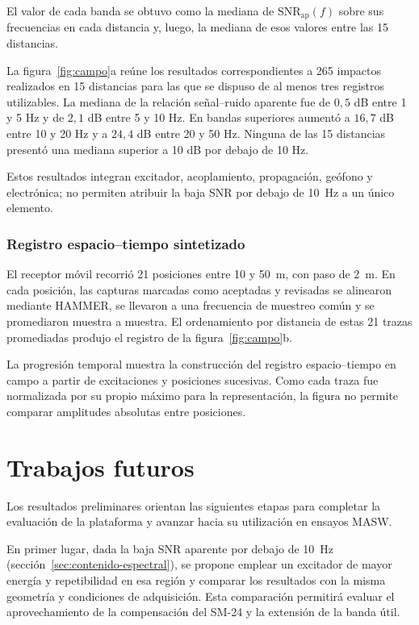 El valor de cada banda se obtuvo como la mediana de \(\mathrm{SNR}_{\mathrm{ap}}(f)\) sobre sus frecuencias en cada distancia y, luego, la mediana de esos valores entre las 15 distancias.

La figura~\ref{fig:campo}a reúne los resultados correspondientes a 265 impactos realizados en 15 distancias para las que se dispuso de al menos tres registros utilizables. La mediana de la relación señal--ruido aparente fue de \(0{,}5\) dB entre 1 y 5 Hz y de \(2{,}1\) dB entre 5 y 10 Hz. En bandas superiores aumentó a \(16{,}7\) dB entre 10 y 20 Hz y a \(24{,}4\) dB entre 20 y 50 Hz. Ninguna de las 15 distancias presentó una mediana superior a 10 dB por debajo de 10 Hz.

Estos resultados integran excitador, acoplamiento, propagación, geófono y electrónica; no permiten atribuir la baja SNR por debajo de 10~Hz a un único elemento.

\subsubsection{Registro espacio--tiempo sintetizado}
\label{sec:registro-espacio-tiempo}

El receptor móvil recorrió 21 posiciones entre 10 y 50~m, con paso de 2~m. En cada posición, las capturas marcadas como aceptadas y revisadas se alinearon mediante HAMMER, se llevaron a una frecuencia de muestreo común y se promediaron muestra a muestra. El ordenamiento por distancia de estas 21 trazas promediadas produjo el registro de la figura~\ref{fig:campo}b.

La progresión temporal muestra la construcción del registro espacio--tiempo en campo a partir de excitaciones y posiciones sucesivas. Como cada traza fue normalizada por su propio máximo para la representación, la figura no permite comparar amplitudes absolutas entre posiciones.

\section{Trabajos futuros}
\label{sec:trabajos-futuros}

Los resultados preliminares orientan las siguientes etapas para completar la evaluación de la plataforma y avanzar hacia su utilización en ensayos MASW.

En primer lugar, dada la baja SNR aparente por debajo de 10~Hz (sección~\ref{sec:contenido-espectral}), se propone emplear un excitador de mayor energía y repetibilidad en esa región y comparar los resultados con la misma geometría y condiciones de adquisición. Esta comparación permitirá evaluar el aprovechamiento de la compensación del SM-24 y la extensión de la banda útil.

